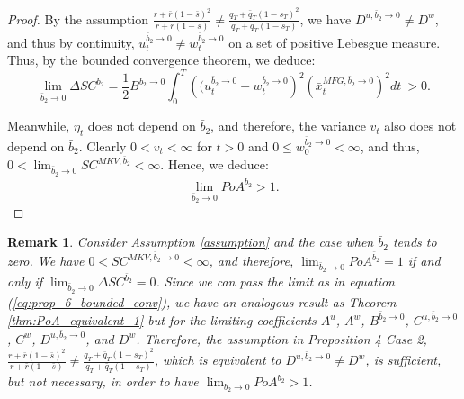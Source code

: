 \documentclass[11pt]{article}
\newtheorem{remark}{Remark}
\begin{document}
\begin{proof}
   	By the assumption $\frac{r + \bar{r}(1- \bar{s})^2}{r + \bar{r}(1-\bar{s})} \neq \frac{q_T+\bar{q}_T(1-s_T)^2}{q_T+\bar{q}_T(1-s_T)}$, we have $D^{u,\bar{b}_2 \to 0} \neq D^{w}$, and thus by continuity, $u^{\bar{b}_2 \to 0}_t\neq w^{\bar{b}_2 \to 0}_t$ on a set of positive Lebesgue measure. 
   	 Thus, by the bounded convergence theorem, we deduce:
	\begin{equation}
	\lim_{\bar{b}_2 \to 0} \Delta SC^{\bar{b}_2} = \frac{1}{2} B^{\bar{b}_2 \to 0} \int_0^T \left( (u_t^{\bar{b}_2 \to 0} - w_t^{\bar{b}_2 \to 0}\right)^2 \left (\bar{x}_t^{MFG,\bar{b}_2 \to 0} \right)^2 dt \  > 0.
	\label{eq:prop_6_bounded_conv}
	\end{equation}	
	
	Meanwhile, $\eta_t$ does not depend on $\bar{b}_2$, and therefore, the variance $v_t$ also does not depend on $\bar{b}_2$. Clearly $0<v_t<\infty$ for $t>0$ and $0 \leq w^{\bar{b}_2 \to 0}_0 < \infty$, and thus,
	$ 0<\lim_{\bar{b}_2 \to 0}SC^{MKV,\bar{b}_2} <\infty.$
	Hence, we deduce:
	$$ \lim_{\bar{b}_2 \to 0} PoA^{\bar{b}_2} > 1. $$
\end{proof}

\begin{remark}
	Consider Assumption \ref{assumption} and the case when $\bar{b}_2$ tends to zero. We have $0< SC^{MKV, \bar{b}_2 \to 0} < \infty$, and therefore, $\lim_{\bar{b}_2 \to 0} PoA^{\bar{b}_2 } =1$ if and only if $\lim_{\bar{b}_2 \to 0} \Delta SC^{\bar{b}_2} = 0$. Since we can pass the limit as in equation (\ref{eq:prop_6_bounded_conv}), we have an analogous result as Theorem \ref{thm:PoA_equivalent_1} but for the limiting coefficients $A^u$, $A^w$, $B^{\bar{b}_2 \to 0}$, $C^{u,\bar{b}_2 \to 0}$, $C^w$, $D^{u,\bar{b}_2 \to 0}$, and $D^w$. Therefore, the assumption in Proposition 4 Case 2, $\frac{r + \bar{r}(1- \bar{s})^2}{r + \bar{r}(1-\bar{s})} \neq \frac{q_T+\bar{q}_T(1-s_T)^2}{q_T+\bar{q}_T(1-s_T)}$, which is equivalent to $D^{u,\bar{b}_2 \to 0} \neq D^w$, is sufficient, but not necessary, in order to have $\lim_{b_2 \to 0}PoA^{b_2}>1$. 
\label{remark_6}
\end{remark}
\end{document}
